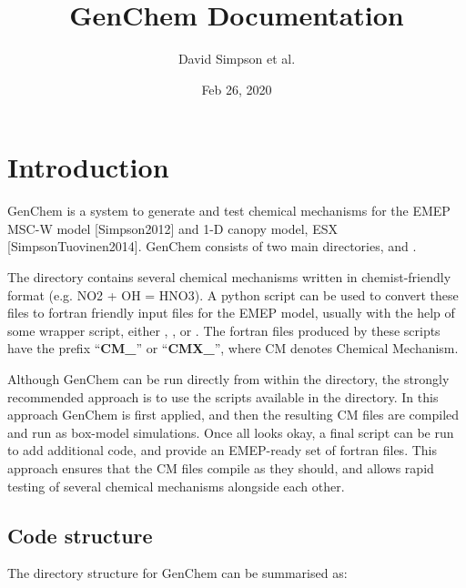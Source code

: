 \documentclass[a4paper,10pt,english]{sphinxmanual}
\title{GenChem Documentation}
\date{Feb 26, 2020}
\author{David Simpson et al.}
\begin{document}
\pagestyle{empty}
\sphinxmaketitle
\pagestyle{plain}
\sphinxtableofcontents
\pagestyle{normal}
\label{\detokenize{index::doc}}



\chapter{Introduction}
\label{\detokenize{GenChemDoc_intro:introduction}}\label{\detokenize{GenChemDoc_intro::doc}}
GenChem is a system to generate and test chemical mechanisms for the
EMEP MSC-W model {[}Simpson2012{]} and 1-D canopy model, ESX {[}SimpsonTuovinen2014{]}.
GenChem consists of two main directories,  and .

The  directory contains several chemical mechanisms written
in chemist-friendly format (e.g.   NO2 + OH = HNO3).
A python script  can be used to convert these files
to fortran friendly input files for the EMEP model, usually with the help
of some wrapper script, either , , or .
The fortran files produced by these scripts
have the prefix “{\color{red}\bfseries{}CM\_}” or “{\color{red}\bfseries{}CMX\_}”, where CM denotes Chemical Mechanism.

Although GenChem can be run directly from within the  directory,
the strongly recommended  approach is to use the scripts available
in the  directory. In this approach GenChem is first applied, and
then the resulting CM files are compiled and run
as box-model simulations. Once all looks okay, a final script
can be run to add additional code, and provide an EMEP-ready
set of fortran files. This approach ensures that the CM files
compile as they should, and allows rapid testing of several chemical
mechanisms alongside each other.


\section{Code structure}
\label{\detokenize{GenChemDoc_intro:code-structure}}
The directory structure for GenChem can be summarised as:
\end{document}
